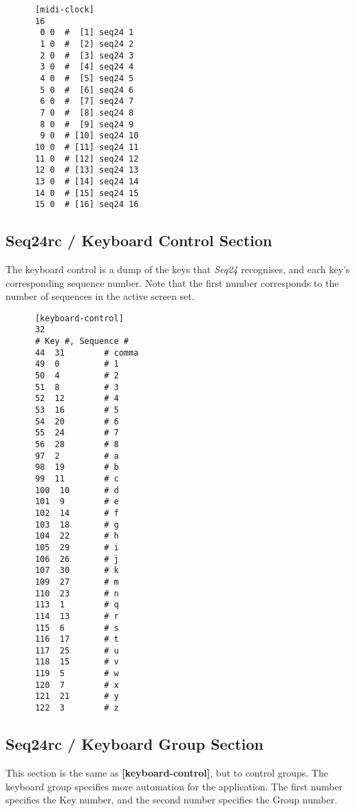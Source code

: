    \begin{verbatim}
      [midi-clock]
      16
       0 0  #  [1] seq24 1
       1 0  #  [2] seq24 2
       2 0  #  [3] seq24 3
       3 0  #  [4] seq24 4
       4 0  #  [5] seq24 5
       5 0  #  [6] seq24 6
       6 0  #  [7] seq24 7
       7 0  #  [8] seq24 8
       8 0  #  [9] seq24 9
       9 0  # [10] seq24 10
      10 0  # [11] seq24 11
      11 0  # [12] seq24 12
      12 0  # [13] seq24 13
      13 0  # [14] seq24 14
      14 0  # [15] seq24 15
      15 0  # [16] seq24 16
   \end{verbatim}

\subsection{Seq24rc / Keyboard Control Section}
\label{subsec:seq24_rc_file_keyboard_control}
        
   The keyboard control is a dump of the keys that \textsl{Seq24}
   recognises, and each key's corresponding sequence number.
   Note that the first number corresponds to the number of sequences in
   the active screen set.

   \begin{verbatim}
      [keyboard-control]
      32
      # Key #, Sequence # 
      44  31        # comma
      49  0         # 1
      50  4         # 2
      51  8         # 3
      52  12        # 4
      53  16        # 5
      54  20        # 6
      55  24        # 7
      56  28        # 8
      97  2         # a
      98  19        # b
      99  11        # c
      100  10       # d
      101  9        # e
      102  14       # f
      103  18       # g
      104  22       # h
      105  29       # i
      106  26       # j
      107  30       # k
      109  27       # m
      110  23       # n
      113  1        # q
      114  13       # r
      115  6        # s
      116  17       # t
      117  25       # u
      118  15       # v
      119  5        # w
      120  7        # x
      121  21       # y
      122  3        # z
   \end{verbatim}

\subsection{Seq24rc / Keyboard Group Section}
\label{subsec:seq24_rc_file_keyboard_group}

   This section is the same as
   \textbf{[keyboard-control]}, but to control groups.
   The keyboard group specifies more automation for the application.  The
   first number specifies the Key number, and the second number specifies
   the Group number.

